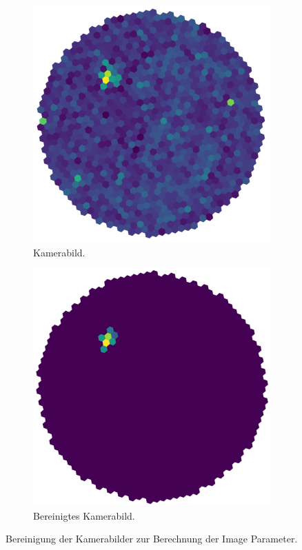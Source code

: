 \begin{figure}[htpb]
  \centering
  \begin{subfigure}[c]{0.35\linewidth}
    \includegraphics[width=\linewidth]{pictures/uncleaned.png}
    \caption{Kamerabild.}%
    \label{fig:uncleaned}
  \end{subfigure}
	\hspace{1cm}
  \begin{subfigure}[c]{0.35\linewidth}
    \includegraphics[width=\linewidth]{pictures/cleaned.png}
    \caption{Bereinigtes Kamerabild.}%
    \label{fig:cleaned}
  \end{subfigure}
  \caption{Bereinigung der Kamerabilder zur Berechnung der Image Parameter.}%
  \label{fig:cleaning}
\end{figure}

